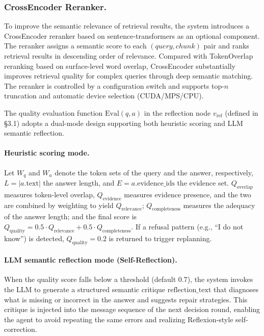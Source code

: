 \documentclass[runningheads]{llncs}
\begin{document}
\subsubsection{CrossEncoder Reranker.}

To improve the semantic relevance of retrieval results, the system introduces a CrossEncoder reranker based on sentence-transformers as an optional component. The reranker assigns a semantic score to each $(query, chunk)$ pair and ranks retrieval results in descending order of relevance. Compared with TokenOverlap reranking based on surface-level word overlap, CrossEncoder substantially improves retrieval quality for complex queries through deep semantic matching. The reranker is controlled by a configuration switch and supports top-$n$ truncation and automatic device selection (CUDA/MPS/CPU).

The quality evaluation function $\text{Eval}(q, a)$ in the reflection node $v_{\text{ref}}$ (defined in \S3.1) adopts a dual-mode design supporting both heuristic scoring and LLM semantic reflection.

\paragraph{Heuristic scoring mode.}
Let $W_q$ and $W_a$ denote the token sets of the query and the answer, respectively, $L = |a.\text{text}|$ the answer length, and $E = a.\text{evidence\_ids}$ the evidence set. $Q_{\text{overlap}}$ measures token-level overlap, $Q_{\text{evidence}}$ measures evidence presence, and the two are combined by weighting to yield $Q_{\text{relevance}}$; $Q_{\text{completeness}}$ measures the adequacy of the answer length; and the final score is $Q_{\text{quality}} = 0.5 \cdot Q_{\text{relevance}} + 0.5 \cdot Q_{\text{completeness}}$. If a refusal pattern (e.g., ``I do not know'') is detected, $Q_{\text{quality}} = 0.2$ is returned to trigger replanning.

\paragraph{LLM semantic reflection mode (Self-Reflection).}
When the quality score falls below a threshold (default 0.7), the system invokes the LLM to generate a structured semantic critique $\text{reflection\_text}$ that diagnoses what is missing or incorrect in the answer and suggests repair strategies. This critique is injected into the message sequence of the next decision round, enabling the agent to avoid repeating the same errors and realizing Reflexion-style self-correction.
\end{document}
